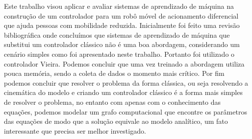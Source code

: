 
\label{Cap:Conclusao}

Este trabalho visou aplicar e avaliar sistemas de aprendizado de máquina
na construção de um controlador para um robô móvel de acionamento diferencial
que ajuda pessoas com mobilidade reduzida. Inicialmente foi feito uma
revisão bibliográfica onde concluímos que sistemas de aprendizado de
máquina que substitui um controlador clássico não é uma boa abordagem,
considerando um cenário simples como foi apresentado neste trabalho.
Portanto foi utilizado o controlador Vieira.
Podemos concluir que uma vez treinado a abordagem utiliza pouca memória,
sendo a coleta de dados o momento mais crítico. Por fim podemos concluir
que resolver o problema da forma clássica, ou seja resolvendo a cinemática
do modelo e criando um controlador clássico é a forma mais simples
de resolver o problema, no entanto com apenas com o conhecimento das equações,
podemos modelar um grafo computacional que encontre os parâmetros das
equações de modo que a solução equivale ao modelo analítico, um fato
interessante que precisa ser melhor investigado.